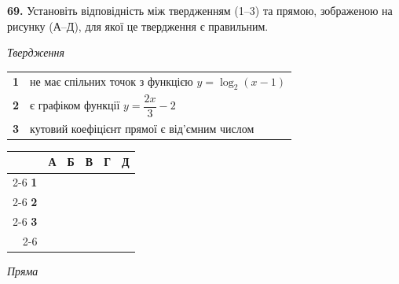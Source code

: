\documentclass[14pt]{extarticle}
\newcommand{\answerGrid}{
    \begingroup
    \setlength{\tabcolsep}{4pt}
    \renewcommand{\arraystretch}{1.2}
    \small
    \begin{tabular}{r|c|c|c|c|c|}
         \multicolumn{1}{c}{} & \multicolumn{1}{c}{\textbf{А}} & \multicolumn{1}{c}{\textbf{Б}} & \multicolumn{1}{c}{\textbf{В}} & \multicolumn{1}{c}{\textbf{Г}} & \multicolumn{1}{c}{\textbf{Д}} \\ \cline{2-6}
         \textbf{1} & & & & & \\ \cline{2-6}
         \textbf{2} & & & & & \\ \cline{2-6}
         \textbf{3} & & & & & \\ \cline{2-6}
    \end{tabular}
    \endgroup
}
\begin{document}
\vspace{0.7cm}


\noindent\textbf{69.} Установіть відповідність між твердженням (1--3) та прямою, зображеною на рисунку (А--Д), для якої це твердження є правильним.

\vspace{0.3cm}

\noindent
\begin{minipage}[t]{0.60\textwidth}
    \textit{Твердження} \par \vspace{0.2cm}
    \begin{tabular}{@{}p{0.4cm} p{9cm}@{}}
    \textbf{1} & не має спільних точок з функцією $y=\log_2(x-1)$ \\[0.4cm]
    \textbf{2} & є графіком функції \colorbox{yellow!30}{$y=\dfrac{2x}{3}-2$} \\[0.4cm]
    \textbf{3} & кутовий коефіцієнт прямої є від'ємним числом \\
    \end{tabular}
\end{minipage}%
\hfill
\begin{minipage}[t]{0.30\textwidth}
    \vspace{0.5cm}
    \answerGrid
\end{minipage}

\vspace{0.5cm}
\textit{Пряма} \par \vspace{0.2cm}
\end{document}
